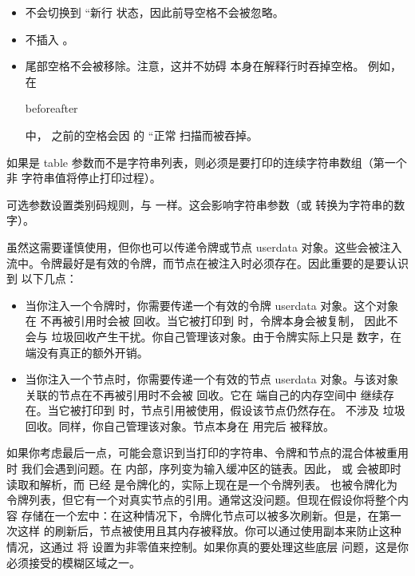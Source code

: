 \begin{itemize}
\item \TEX 不会切换到 ``新行 状态，因此前导空格不会被忽略。

\item 不插入 。

\item 尾部空格不会被移除。注意，这并不妨碍 \TEX 本身在解释行时吞掉空格。
    例如，在

    \begin{typing}
    beforeafter
    \end{typing}

    中， 之前的空格会因  的 ``正常
    扫描而被吞掉。

\end{itemize}

如果是 table 参数而不是字符串列表，则必须是要打印的连续字符串数组（第一个非
字符串值将停止打印过程）。

可选参数设置类别码规则，与  一样。这会影响字符串参数（或
转换为字符串的数字）。

虽然这需要谨慎使用，但你也可以传递令牌或节点 userdata 对象。这些会被注入
流中。令牌最好是有效的令牌，而节点在被注入时必须存在。因此重要的是要认识到
以下几点：

\begin{itemize}\item 当你注入一个令牌时，你需要传递一个有效的令牌 userdata 对象。这个对象在
    不再被引用时会被 \LUA 回收。当它被打印到 \TEX 时，令牌本身会被复制，
    因此不会与 \LUA 垃圾回收产生干扰。你自己管理该对象。由于令牌实际上只是
    数字，在 \TEX 端没有真正的额外开销。

\item 当你注入一个节点时，你需要传递一个有效的节点 userdata 对象。与该对象
    关联的节点在不再被引用时不会被 \LUA 回收。它在 \TEX 端自己的内存空间中
    继续存在。当它被打印到 \TEX 时，节点引用被使用，假设该节点仍然存在。
    不涉及 \LUA 垃圾回收。同样，你自己管理该对象。节点本身在 \TEX 用完后
    被释放。

\end{itemize}

如果你考虑最后一点，可能会意识到当打印的字符串、令牌和节点的混合体被重用时
我们会遇到问题。在 \TEX 内部，序列变为输入缓冲区的链表。因此，
或  会被即时读取和解析，而  已经
是令牌化的，实际上现在是一个令牌列表。 也被令牌化为
令牌列表，但它有一个对真实节点的引用。通常这没问题。但现在假设你将整个内容
存储在一个宏中：在这种情况下，令牌化节点可以被多次刷新。但是，在第一次这样
的刷新后，节点被使用且其内存被释放。你可以通过使用副本来防止这种情况，这通过
将  设置为非零值来控制。如果你真的要处理这些底层
问题，这是你必须接受的模糊区域之一。

